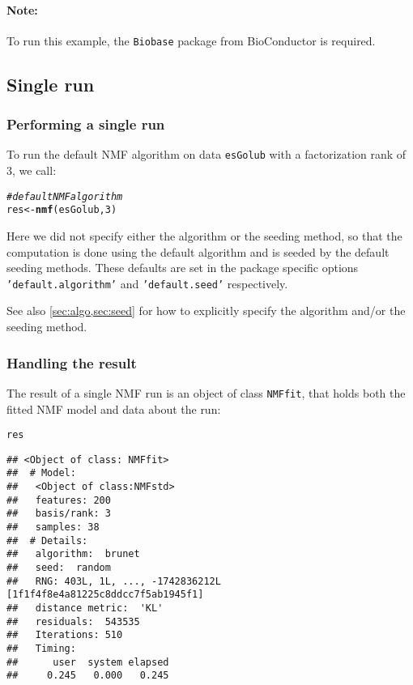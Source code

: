 \documentclass[a4paper]{article}\usepackage[]{graphicx}\usepackage[]{color}
\makeatletter
\newcommand{\hlnum}[1]{\textcolor[rgb]{0.686,0.059,0.569}{#1}}%
\newcommand{\hlcom}[1]{\textcolor[rgb]{0.678,0.584,0.686}{\textit{#1}}}%
\newcommand{\hlstd}[1]{\textcolor[rgb]{0.345,0.345,0.345}{#1}}%
\newcommand{\hlkwb}[1]{\textcolor[rgb]{0.69,0.353,0.396}{#1}}%
\newcommand{\hlkwd}[1]{\textcolor[rgb]{0.737,0.353,0.396}{\textbf{#1}}}%
\newenvironment{kframe}{%
 \def\at@end@of@kframe{}%
 \ifinner\ifhmode%
  \def\at@end@of@kframe{\end{minipage}}%
  \begin{minipage}{\columnwidth}%
 \fi\fi%
 \def\FrameCommand##1{\hskip\@totalleftmargin \hskip-\fboxsep
 \colorbox{shadecolor}{##1}\hskip-\fboxsep
     \hskip-\linewidth \hskip-\@totalleftmargin \hskip\columnwidth}%
 \MakeFramed {\advance\hsize-\width
   \@totalleftmargin\z@ \linewidth\hsize
   \@setminipage}}%
 {\par\unskip\endMakeFramed%
 \at@end@of@kframe}
\newenvironment{knitrout}{}{} %
\let\code=\texttt
\makeatother
\begin{document}

\paragraph{Note:} To run this example, the \code{Biobase} package from BioConductor is required.

\subsection{Single run}\label{sec:single_run}

\subsubsection{Performing a single run}
To run the default NMF algorithm on data \code{esGolub} with a factorization rank of 3, we call: 

\begin{knitrout}
\color{fgcolor}\begin{kframe}
\begin{alltt}
\hlcom{# default NMF algorithm}
\hlstd{res} \hlkwb{<-} \hlkwd{nmf}\hlstd{(esGolub,} \hlnum{3}\hlstd{)}
\end{alltt}
\end{kframe}
\end{knitrout}


Here we did not specify either the algorithm or the seeding method, so that the computation is done using the default algorithm and is seeded by the 
default seeding methods.
These defaults are set in the package specific options \code{'default.algorithm'} 
and \code{'default.seed'} respectively.

See also \cref{sec:algo,sec:seed} for how to explicitly specify the algorithm and/or the seeding method.

\subsubsection{Handling the result}

The result of a single NMF run is an object of class \code{NMFfit}, that holds both the fitted NMF model and data about the run:

\begin{knitrout}
\color{fgcolor}\begin{kframe}
\begin{alltt}
\hlstd{res}
\end{alltt}
\begin{verbatim}
## <Object of class: NMFfit>
##  # Model:
##   <Object of class:NMFstd>
##   features: 200 
##   basis/rank: 3 
##   samples: 38 
##  # Details:
##   algorithm:  brunet 
##   seed:  random 
##   RNG: 403L, 1L, ..., -1742836212L [1f1f4f8e4a81225c8ddcc7f5ab1945f1]
##   distance metric:  'KL' 
##   residuals:  543535 
##   Iterations: 510 
##   Timing:
##      user  system elapsed 
##     0.245   0.000   0.245
\end{verbatim}
\end{kframe}
\end{knitrout}
\end{document}
